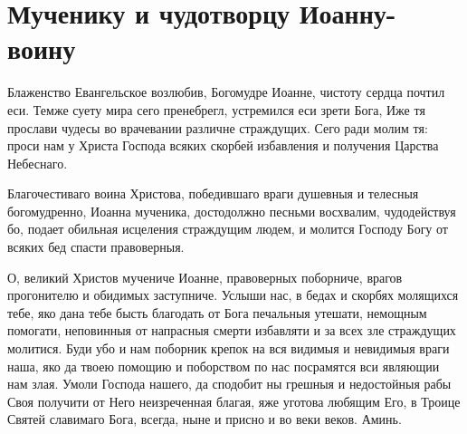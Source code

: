 \section{Мученику и чудотворцу Иоанну-воину}\begin{mymulticols}


Блаженство Евангельское возлюбив, Богомудре Иоанне, чистоту сердца почтил еси. Темже суету мира сего пренебрегл, устремился еси зрети Бога, Иже тя прослави чудесы во врачевании различне страждущих. Сего ради молим тя: проси нам у Христа Господа всяких скорбей избавления и получения Царства Небеснаго.


Благочестиваго воина Христова, победившаго враги душевныя и телесныя богомудренно, Иоанна мученика, достодолжно песньми восхвалим, чудодействуя бо, подает обильная исцеления страждущим людем, и молится Господу Богу от всяких бед спасти правоверныя.


О, великий Христов мучениче Иоанне, правоверных поборниче, врагов прогонителю и обидимых заступниче. Услыши нас, в бедах и скорбях молящихся тебе, яко дана тебе бысть благодать от Бога печальныя утешати, немощным помогати, неповинныя от напрасныя смерти избавляти и за всех зле страждущих молитися. Буди убо и нам поборник крепок на вся видимыя и невидимыя враги наша, яко да твоею помощию и поборством по нас посрамятся вси являющии нам злая. Умоли Господа нашего, да сподобит ны грешныя и недостойныя рабы Своя получити от Него неизреченная благая, яже уготова любящим Его, в Троице Святей славимаго Бога, всегда, ныне и присно и во веки веков. Аминь.

\end{mymulticols}

\mychapterending


